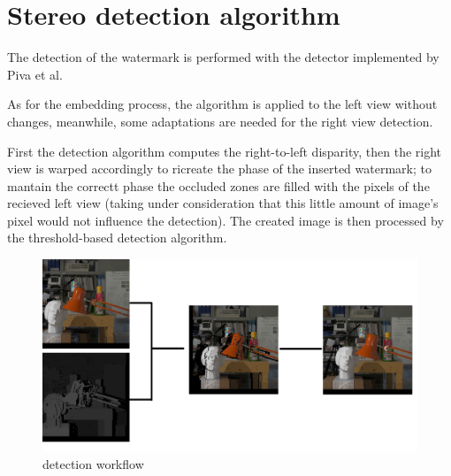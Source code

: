\section{Stereo detection algorithm}

The detection of the watermark is performed with the detector implemented by Piva et al.\newline

As for the embedding process, the algorithm is applied to the left view without changes, meanwhile, some adaptations are needed for the right view detection.\newline

First the detection algorithm computes the right-to-left disparity, then the right view is warped accordingly to ricreate the phase of the inserted watermark; to mantain the correctt phase the occluded zones are filled with the pixels of the recieved left view (taking under consideration that this little amount of image's pixel would not influence the detection).\newline
The created image is then processed by the threshold-based detection algorithm.\newline 

\begin{figure}[h!]
\centering
\includegraphics[width=1\textwidth]{./img/detection_workflow.png}
\caption{\small{detection workflow}}
\label{fig:detflow}
\end{figure}

